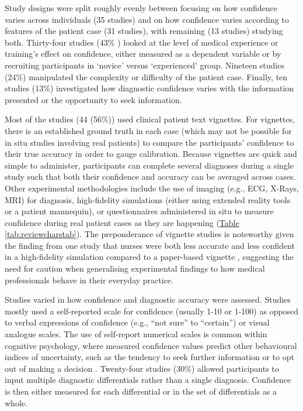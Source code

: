 \documentclass[a4paper, nobind]{templates/ociamthesis}
\begin{document}
\hfill\break
Study designs were split roughly evenly between focusing on how confidence varies across individuals (35 studies) and on how confidence varies according to features of the patient case (31 studies), with remaining (13 studies) studying both. Thirty-four studies (43\% ) looked at the level of medical experience or training's effect on confidence, either measured as a dependent variable or by recruiting participants in `novice' versus `experienced' group. Nineteen studies (24\%) manipulated the complexity or difficulty of the patient case. Finally, ten studies (13\%) investigated how diagnostic confidence varies with the information presented or the opportunity to seek information.

\hfill\break
Most of the studies (44 (56\%)) used clinical patient text vignettes. For vignettes, there is an established ground truth in each case (which may not be possible for in situ studies involving real patients) to compare the participants' confidence to their true accuracy in order to gauge calibration. Because vignettes are quick and simple to administer, participants can complete several diagnoses during a single study such that both their confidence and accuracy can be averaged across cases. Other experimental methodologies include the use of imaging (e.g., ECG, X-Rays, MRI) for diagnosis, high-fidelity simulations (either using extended reality tools or a patient mannequin), or questionnaires administered in situ to measure confidence during real patient cases as they are happening (\hyperref[tab:reviewcharstab]{Table \ref{tab:reviewcharstab}}). The preponderance of vignette studies is noteworthy given the finding from one study that nurses were both less accurate and less confident in a high-fidelity simulation compared to a paper-based vignette \autocite{yang_effect_2012}, suggesting the need for caution when generalising experimental findings to how medical professionals behave in their everyday practice.

\hfill\break
Studies varied in how confidence and diagnostic accuracy were assessed. Studies mostly used a self-reported scale for confidence (usually 1-10 or 1-100) as opposed to verbal expressions of confidence (e.g., ``not sure'' to ``certain'') or visual analogue scales. The use of self-report numerical scales is common within cognitive psychology, where measured confidence values predict other behavioural indices of uncertainty, such as the tendency to seek further information or to opt out of making a decision \autocite{gherman_neural_2015}. Twenty-four studies (30\%) allowed participants to input multiple diagnostic differentials rather than a single diagnosis. Confidence is then either measured for each differential or in the set of differentials as a whole.
\end{document}
